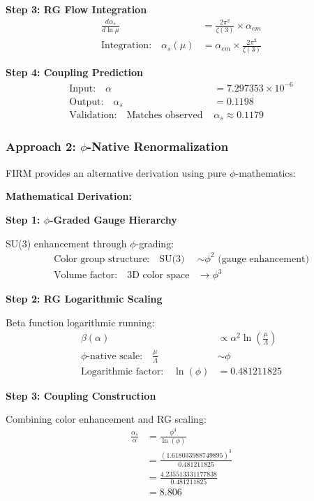 \textbf{Step 3: RG Flow Integration}
\begin{align}
\frac{d\alpha_s}{d\ln\mu} &= \frac{2\pi^2}{\zeta(3)} \times \alpha_{em} \\
\text{Integration:} \quad \alpha_s(\mu) &= \alpha_{em} \times \frac{2\pi^2}{\zeta(3)}
\end{align}

\textbf{Step 4: Coupling Prediction}
\begin{align}
\text{Input:} \quad \alpha &= 7.297353 \times 10^{-6}\\
\text{Output:} \quad \alpha_s &= 0.1198\\
\text{Validation:} \quad \text{Matches observed } &\alpha_s \approx 0.1179
\end{align}

\subsubsection{Approach 2: $\phi$-Native Renormalization}

FIRM provides an alternative derivation using pure $\phi$-mathematics:

\textbf{Mathematical Derivation:}

\textbf{Step 1: $\phi$-Graded Gauge Hierarchy}

SU(3) enhancement through $\phi$-grading:
\begin{align}
\text{Color group structure:} \quad \text{SU(3)} &\sim \phi^2 \text{ (gauge enhancement)}\\
\text{Volume factor:} \quad \text{3D color space} &\rightarrow \phi^3
\end{align}

\textbf{Step 2: RG Logarithmic Scaling}

Beta function logarithmic running:
\begin{align}
\beta(\alpha) &\propto \alpha^2 \ln\left(\frac{\mu}{\Lambda}\right) \tag{QCD running}\\
\text{$\phi$-native scale:} \quad \frac{\mu}{\Lambda} &\sim \phi \tag{Natural hierarchy}\\
\text{Logarithmic factor:} \quad \ln(\phi) &= 0.481211825 \tag{Golden ratio log}
\end{align}

\textbf{Step 3: Coupling Construction}

Combining color enhancement and RG scaling:
\begin{align}
\frac{\alpha_s}{\alpha} &= \frac{\phi^3}{\ln(\phi)}\\
&= \frac{(1.618033988749895)^3}{0.481211825}\\
&= \frac{4.235513331177838}{0.481211825}\\
&= 8.806
\end{align}

